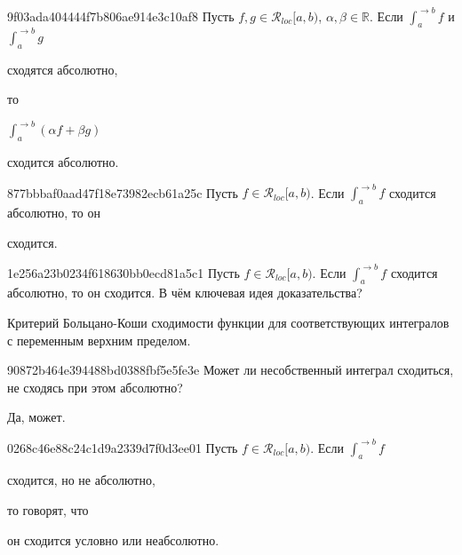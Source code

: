 \begin{note}{9f03ada404444f7b806ae914e3c10af8}
    Пусть \({ f, g \in \mathcal R_{loc}[a, b) }\), \({ \alpha, \beta \in \mathbb R }\).
    Если \({ \int_{a}^{\to b} f }\) и \({ \int_{a}^{\to b} g }\) \begin{icloze}{2}сходятся абсолютно,\end{icloze} то \begin{icloze}{3}\({ \int_{a}^{\to b} (\alpha f + \beta g) }\)\end{icloze} \begin{icloze}{1}сходится абсолютно.\end{icloze}
\end{note}

\begin{note}{877bbbaf0aad47f18e73982ecb61a25c}
    Пусть \({ f \in \mathcal R_{loc}[a, b) }\).
    Если \({ \int_{a}^{\to b} f }\) сходится абсолютно, то он \begin{icloze}{1}сходится.\end{icloze}
\end{note}

\begin{note}{1e256a23b0234f618630bb0ecd81a5c1}
    Пусть \({ f \in \mathcal R_{loc}[a, b) }\).
    Если \({ \int_{a}^{\to b} f }\) сходится абсолютно, то он сходится.
    В чём ключевая идея доказательства?

    \begin{cloze}{1}
        Критерий Больцано-Коши сходимости функции для соответствующих интегралов с переменным верхним пределом.
    \end{cloze}
\end{note}

\begin{note}{90872b464e394488bd0388fbf5e5fe3e}
    Может ли несобственный интеграл сходиться, не сходясь при этом абсолютно?

    \begin{cloze}{1}
        Да, может.
    \end{cloze}
\end{note}

\begin{note}{0268c46e88c24c1d9a2339d7f0d3ee01}
    Пусть \({ f \in \mathcal R_{loc}[a, b) }\).
    Если \({ \int_{a}^{\to b} f }\) \begin{icloze}{2}сходится, но не абсолютно,\end{icloze} то говорят, что \begin{icloze}{1}он сходится условно или неабсолютно.\end{icloze}
\end{note}

